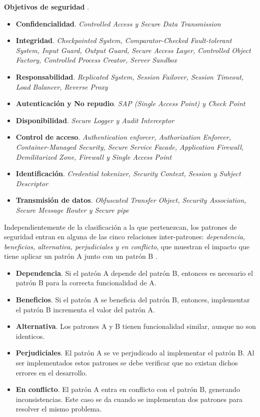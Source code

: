 \vspace{0.3cm}

\textbf{Objetivos de seguridad} \cite{ScaJooYsk06}.

\begin{itemize}[noitemsep]
	\item \textbf{Confidencialidad}. \textit{Controlled Access y Secure Data Transmission }
	\item \textbf{Integridad}. \textit{Checkpointed System, Comparator-Checked Fault-tolerant System, Input Guard, Output Guard, Secure Access Layer, Controlled Object Factory, Controlled Process Creator, Server Sandbox}
	\item \textbf{Responsabilidad}. \textit{Replicated System, Session Failover, Session Timeout, Load Balancer, Reverse Proxy}
	\item \textbf{Autenticación y No repudio}. \textit{SAP (Single Access Point) y Check Point}
	\item \textbf{Disponibilidad}. \textit{Secure Logger y Audit Interceptor}
	\item \textbf{Control de acceso}. \textit{Authentication enforcer, Authorization Enforcer, Container-Managed Security, Secure Service Facade, Application Firewall, Demilitarized Zone, Firewall y Single Access Point}
	\item \textbf{Identificación}. \textit{Credential tokenizer, Security Context, Session y Subject Descriptor}
	\item \textbf{Transmisión de datos}. \textit{Obfuscated Transfer Object, Security Association, Secure Message Router y Secure pipe}

\end{itemize}


Independientemente de la clasificación a la que pertenezcan, los patrones de seguridad entran en alguna de las cinco relaciones inter-patrones: \textit{dependencia, beneficios, alternativa, perjudiciales y en conflicto}, que muestran el impacto que tiene aplicar un patrón A junto con un patrón B \cite{ScaJooYsk06}. 

\begin{itemize}[noitemsep]
  \item[] \textbf{Dependencia}. Si el patrón A depende del patrón B, entonces es necesario el patrón B para la correcta funcionalidad de A.
  \item[] \textbf{Beneficios}. Si el patrón A se beneficia del patrón B, entonces, implementar el patrón B incrementa el valor del patrón A.
  \item[] \textbf{Alternativa}. Los patrones A y B tienen funcionalidad similar, aunque no son identicos.
  \item[] \textbf{Perjudiciales}. El patrón A se ve perjudicado al implementar el patrón B. Al ser implementados estos patrones se debe verificar que no existan dichos errores en el desarrollo.
  \item[] \textbf{En conflicto}. El patrón A entra en conflicto con el patrón B, generando inconsistencias. Este caso se da cuando se implementan dos patrones para resolver el mismo problema.
\end{itemize}

